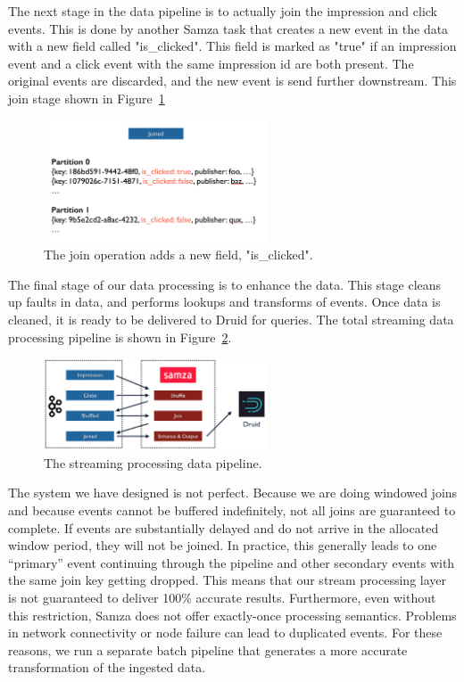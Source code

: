 \documentclass{vldb}
\begin{document}
The next stage in the data pipeline is to actually join the impression and
click events. This is done by another Samza task that creates a new event in
the data with a new field called "is\_clicked".  This field is marked as "true"
if an impression event and a click event with the same impression id are both
present. The original events are discarded, and the new event is send further
downstream. This join stage shown in Figure~\ref{fig:joined}

\begin{figure}
\centering
\includegraphics[width = 2.6in]{joined}
\caption{
The join operation adds a new field, "is\_clicked".
}
\label{fig:joined}
\end{figure}

The final stage of our data processing is to enhance the data. This stage
cleans up faults in data, and performs lookups and transforms of events. Once
data is cleaned, it is ready to be delivered to Druid for queries. The total
streaming data processing pipeline is shown in Figure~\ref{fig:pipeline}.

\begin{figure}
\centering
\includegraphics[width = 2.6in]{pipeline}
\caption{
The streaming processing data pipeline.
}
\label{fig:pipeline}
\end{figure}

The system we have designed is not perfect. Because we are doing windowed joins
and because events cannot be buffered indefinitely, not all joins are
guaranteed to complete. If events are substantially delayed and do not arrive
in the allocated window period, they will not be joined. In practice, this
generally leads to one “primary” event continuing through the pipeline and
other secondary events with the same join key getting dropped.  This means that
our stream processing layer is not guaranteed to deliver 100\% accurate
results. Furthermore, even without this restriction, Samza does not offer
exactly-once processing semantics. Problems in network connectivity or node
failure can lead to duplicated events. For these reasons, we run a separate
batch pipeline that generates a more accurate transformation of the ingested
data.
\end{document}
